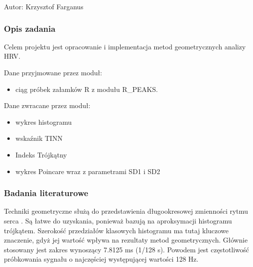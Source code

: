 \documentclass[a4paper, 11pt]{article}
\begin{document}
Autor: Krzysztof Farganus


\subsubsection{Opis zadania}
\label{sec:hrv2:desc}

Celem projektu jest opracowanie i implementacja metod geometrycznych
analizy HRV.

Dane przyjmowane przez moduł: 
\begin{itemize}
\item ciąg próbek załamków R z modułu R\_PEAKS.
\end{itemize}
Dane zwracane przez moduł:
\begin{itemize}
\item wykres histogramu 
\item wskaźnik TINN 
\item Indeks Trójkątny
\item wykres Poincare wraz z parametrami SD1 i SD2
\end{itemize}

\subsubsection{Badania literaturowe}
\label{sec:hrv2:papers}

Techniki geometryczne służą do przedstawienia długookresowej zmienności
rytmu serca \cite{hrv2-pl}. Są łatwe do uzyskania, ponieważ bazują na aproksymacji
histogramu trójkątem. Szerokość przedziałów klasowych histogramu ma
tutaj kluczowe znaczenie, gdyż jej wartość wpływa na rezultaty metod
geometrycznych. Głównie stosowany jest zakres wynoszący 7.8125 ms
(1/128 s). Powodem jest częstotliwość próbkowania sygnału o najczęściej
występującej wartości 128 Hz.
\end{document}

